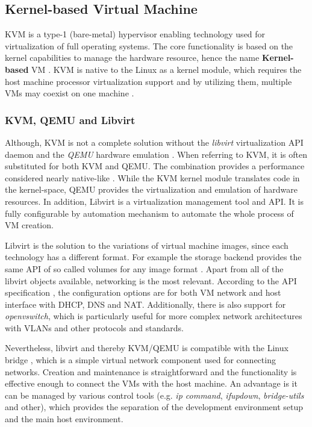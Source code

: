 \subsection{Kernel-based Virtual Machine \label{anal:virtual:kvm}}
KVM is a type-1 (bare-metal) hypervisor enabling technology used for virtualization of full operating systems. The core functionality is based on the kernel capabilities to manage the hardware resource, hence the name \textbf{Kernel-based} VM \cite{redhat:kvm}. KVM is native to the Linux as a kernel module, which requires the host machine processor virtualization support and by utilizing them, multiple VMs may coexist on one machine \cite{article:kvm_qemu}.

\subsubsection*{KVM, QEMU and Libvirt \label{anal:virtual:kvm:combined}}

Although, KVM is not a complete solution without the \textit{libvirt} virtualization API daemon and the \textit{QEMU} hardware emulation \cite{docs:qemu}. When referring to KVM, it is often substituted for both KVM and QEMU. The combination provides a performance considered nearly native-like \cite{article:kvm_qemu}. While the KVM kernel module translates code in the kernel-space, QEMU provides the virtualization and emulation of hardware resources. In addition, Libvirt is a virtualization management tool and API. It is fully configurable by automation mechanism to automate the whole process of VM creation.

Libvirt is the solution to the variations of virtual machine images, since each technology has a different format. For example the storage backend provides the same API of so called volumes for any image format \cite{docs:libvirt:volume}. Apart from all of the libvirt objects available, networking is the most relevant. According to the API specification \cite{docs:libvirt:network}, the configuration options are for both VM network and host interface with DHCP, DNS and NAT. Additionally, there is also support for \textit{openvswitch}, which is particularly useful for more complex network architectures with VLANs and other protocols and standards.

Nevertheless, libvirt and thereby KVM/QEMU is compatible with the Linux bridge \cite{docs:arch:bridge}, which is a simple virtual network component used for connecting networks. Creation and maintenance is straightforward and the functionality is effective enough to connect the VMs with the host machine. An advantage is it can be managed by various control tools (e.g. \textit{ip command}, \textit{ifupdown}, \textit{bridge-utils} and other), which provides the separation of the development environment setup and the main host environment.

